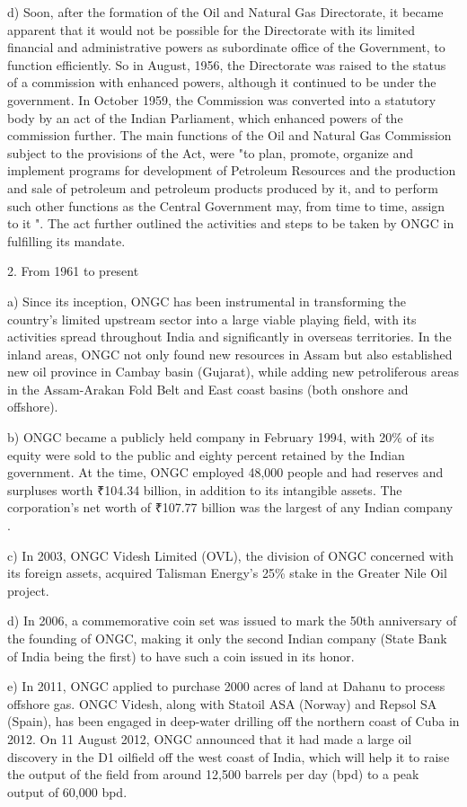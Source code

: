 \documentclass[11pt,a4paper]{article}
\begin{document}
d) Soon, after the formation of the Oil and Natural Gas Directorate, it became apparent that it would not be possible for the Directorate with its limited financial and administrative powers as subordinate office of the Government, to function efficiently. So in August, 1956, the Directorate was raised to the status of a commission with enhanced powers, although it continued to be under the government. In October 1959, the Commission was converted into a statutory body by an act of the Indian Parliament, which enhanced powers of the commission further. The main functions of the Oil and Natural Gas Commission subject to the provisions of the Act, were "to plan, promote, organize and implement programs for development of Petroleum Resources and the production and sale of petroleum and petroleum products produced by it, and to perform such other functions as the Central Government may, from time to time, assign to it ". The act further outlined the activities and steps to be taken by ONGC in fulfilling its mandate.

2. From 1961 to present

a) Since its inception, ONGC has been instrumental in transforming the country's limited upstream sector into a large viable playing field, with its activities spread throughout India and significantly in overseas territories. In the inland areas, ONGC not only found new resources in Assam but also established new oil province in Cambay basin (Gujarat), while adding new petroliferous areas in the Assam-Arakan Fold Belt and East coast basins (both onshore and offshore).

b) ONGC became a publicly held company in February 1994, with 20\% of its equity were sold to the public and eighty percent retained by the Indian government. At the time, ONGC employed 48,000 people and had reserves and surpluses worth ₹104.34 billion, in addition to its intangible assets. The corporation's net worth of ₹107.77 billion was the largest of any Indian company .

c) In 2003, ONGC Videsh Limited (OVL), the division of ONGC concerned with its foreign assets, acquired Talisman Energy's 25\% stake in the Greater Nile Oil project.

d) In 2006, a commemorative coin set was issued to mark the 50th anniversary of the founding of ONGC, making it only the second Indian company (State Bank of India being the first) to have such a coin issued in its honor.

e) In 2011, ONGC applied to purchase 2000 acres of land at Dahanu to process offshore gas. ONGC Videsh, along with Statoil ASA (Norway) and Repsol SA (Spain), has been engaged in deep-water drilling off the northern coast of Cuba in 2012. On 11 August 2012, ONGC announced that it had made a large oil discovery in the D1 oilfield off the west coast of India, which will help it to raise the output of the field from around 12,500 barrels per day (bpd) to a peak output of 60,000 bpd.
\end{document}
